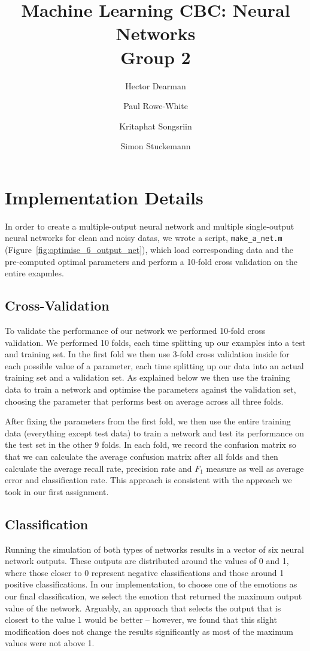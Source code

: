 \documentclass[10pt,a4paper]{article}
\author{Hector Dearman \and Paul Rowe-White \and Kritaphat Songsriin \and Simon Stuckemann}
\title{Machine Learning CBC: Neural Networks\\Group 2}
\begin{document}
\maketitle

\section{Implementation Details}

In order to create a multiple-output neural network and multiple single-output neural networks for clean and noisy datas, we wrote a script, {\tt make\_a\_net.m} (Figure~\ref{fig:optimise_6_output_net}), which load corresponding data and the pre-computed optimal parameters and perform a 10-fold cross validation on the entire exapmles. 

\subsection{Cross-Validation}


To validate the performance of our network we performed 10-fold cross validation. We performed 10 folds, each time splitting up our examples into a test and training set. In the first fold we then use 3-fold cross validation inside for each possible value of a parameter, each time splitting up our data into an actual training set and a validation set. As explained below we then use the training data to train a network and optimise the parameters against the validation set, choosing the parameter that performs best on average across all three folds. 

After fixing the parameters from the first fold, we then use the entire training data (everything except test data) to train a network and test its performance on the test set in the other 9 folds. In each fold, we record the confusion matrix so that we can calculate the average confusion matrix after all folds and then calculate the average recall rate, precision rate and $F_1$ measure as well as average error and classification rate. This approach is consistent with the approach we took in our first assignment.

\subsection{Classification}
Running the simulation of both types of networks results in a vector of six neural network outputs. These outputs are distributed around the values of 0 and 1, where those closer to 0 represent negative classifications and those around 1 positive classifications. In our implementation, to choose one of the emotions as our final classification, we select the emotion that returned the maximum output value of the network. Arguably, an approach that selects the output that is closest to the value 1 would be better -- however, we found that this slight modification does not change the results significantly as most of the maximum values were not above 1.
\end{document}
